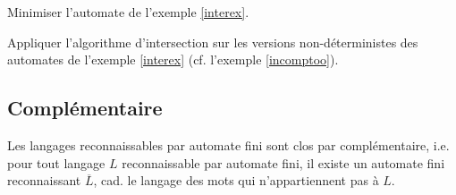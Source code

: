 \begin{exercice}
Minimiser l'automate de l'exemple \ref{interex}.
\end{exercice}

\begin{exercice}
Appliquer l'algorithme d'intersection sur les versions non-déterministes des automates de l'exemple \ref{interex} (cf. l'exemple \ref{incomptoo}).
\end{exercice}

\subsection{Complémentaire}


\begin{theorem}
Les langages reconnaissables par automate fini sont clos par complémentaire, i.e. pour tout langage $L$ reconnaissable par automate fini, il existe un automate fini reconnaissant $\overline{L}$, cad. le langage des mots qui n'appartiennent pas à $L$.
\end{theorem}

